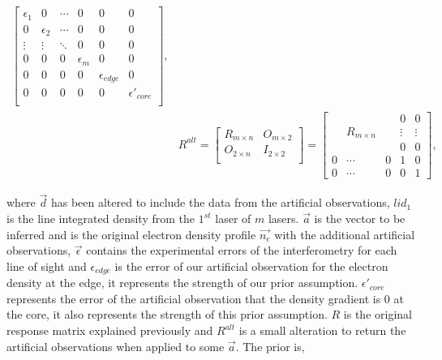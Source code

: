 \begin{equation}
\begin{aligned}
\begin{bmatrix}
\epsilon_1 & 0 & \cdots & 0 & 0 & 0\\
0 & \epsilon_2 & \cdots & 0 & 0 & 0\\
\vdots & \vdots & \ddots & 0 & 0 & 0\\
0 & 0 & 0 &\epsilon_m & 0 & 0\\
0 & 0 & 0 & 0 & \epsilon_{edge} & 0\\
0 & 0 & 0 & 0 & 0 & \epsilon'_{core}\\
\end{bmatrix},\\
&R^{alt} = 
\begin{bmatrix}
 R_{m\times n} &   O_{m\times2} \\
 O_{2\times n} &   I_{2\times 2} \\
\end{bmatrix}
=
\begin{bmatrix}
 &       &    & 0         & 0\\
  &   R_{m\times n}    &    &  \vdots  & \vdots\\
  &       &    & 0        & 0\\
0 & \cdots & 0  & 1        & 0 \\
0 & \cdots & 0  & 0        & 1
\end{bmatrix},
\end{aligned}
\end{equation}

\noindent where $\vec d$ has been altered to include the data from the artificial observations, $lid_1$ is the line integrated density from the $1^{st}$ laser of $m$ lasers. $\vec a$ is the vector to be inferred and is the original electron density profile $\vec{n_e}$ with the additional artificial observations, $\vec \epsilon$ contains the experimental errors of the interferometry for each line of sight and $\epsilon_{edge}$ is the error of our artificial observation for the electron density at the edge, it represents the strength of our prior assumption. $\epsilon'_{core}$ represents the error of the artificial observation that the density gradient is 0 at the core, it also represents the strength of this prior assumption. $R$ is the original response matrix explained previously and $R^{alt}$ is a small alteration to return the artificial observations when applied to some $\vec a$. The prior is,

